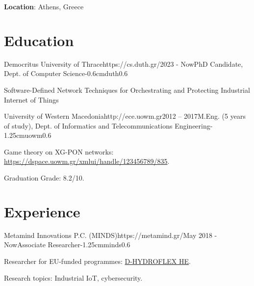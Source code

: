 \documentclass{mycv}
\begin{document}
	\thispagestyle{plain}

	\textbf{Location}: Athens, Greece

    \section{Education}
	\begin{EntryDatedLogo}{Democritus University of Thrace}{https://cs.duth.gr/}{2023 - Now}{PhD Candidate, Dept. of Computer Science}{-0.6cm}{duth}{0.6}
		\begin{Itemize}
			\item Software-Defined Network Techniques for Orchestrating and Protecting Industrial Internet of Things
		\end{Itemize}
	\end{EntryDatedLogo}

	\vspace*{0.5cm}
	
	\begin{EntryDatedLogo}{University of Western Macedonia}{http://ece.uowm.gr}{2012 -- 2017}{M.Eng. (5 years of study), Dept. of Informatics and Telecommunications Engineering}{-1.25cm}{uowm}{0.6}
		\begin{Itemize}
			\item Game theory on XG-PON networks: \url{https://dspace.uowm.gr/xmlui/handle/123456789/835}.
			\item Graduation Grade: 8.2/10.
		\end{Itemize}
	\end{EntryDatedLogo}
	
	\section{Experience}
	\begin{EntryDatedLogo}{Metamind Innovations P.C. (MINDS)}{https://metamind.gr/}{May 2018 - Now}{Associate Researcher}{-1.25cm}{minds}{0.6}
		\begin{Itemize}
			\item Researcher for EU-funded programmes: \href{https://cordis.europa.eu/project/id/101122357}{D-HYDROFLEX HE}.
			\item Research topics: Industrial IoT, cybersecurity.
		\end{Itemize}
	\end{EntryDatedLogo}
\end{document}
